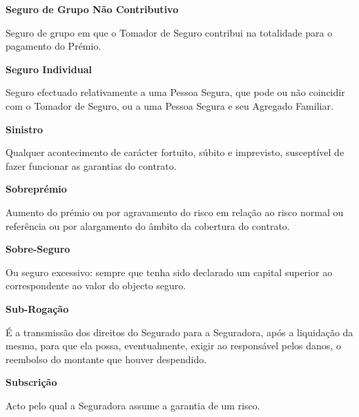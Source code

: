 \begin{description}
\item \textbf{Seguro de Grupo Não Contributivo}

Seguro de grupo em que o Tomador de Seguro contribui na totalidade para o pagamento do Prémio.
\end{description}

\begin{description}
\item \textbf{Seguro Individual}

Seguro efectuado relativamente a uma Pessoa Segura, que pode ou não coincidir com o Tomador de Seguro, ou a uma Pessoa Segura e seu Agregado Familiar.
\end{description}

\begin{description}
\item \textbf{Sinistro}

Qualquer acontecimento de carácter fortuito, súbito e imprevisto, susceptível de fazer funcionar as garantias do contrato.
\end{description}

\begin{description}
\item \textbf{Sobreprémio}

Aumento do prémio ou por agravamento do risco em relação ao risco normal ou referência ou por alargamento do âmbito da cobertura do contrato.
\end{description}

\begin{description}
\item \textbf{Sobre-Seguro}

Ou seguro excessivo: sempre que tenha sido declarado um capital superior ao correspondente ao valor do objecto seguro.
\end{description}

\begin{description}
\item \textbf{Sub-Rogação}

É a transmissão dos direitos do Segurado para a Seguradora, após a liquidação da mesma, para que ela possa, eventualmente, exigir ao responsável pelos danos, o reembolso do montante que houver despendido.
\end{description}

\begin{description}
\item \textbf{Subscrição}

Acto pelo qual a Seguradora assume a garantia de um risco.
\end{description}

